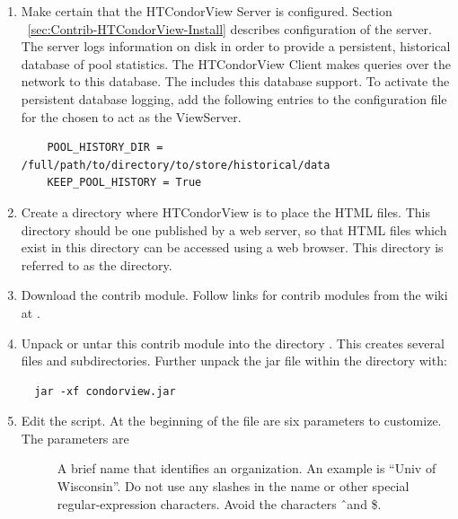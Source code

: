 \begin{enumerate}

\item Make certain that the HTCondorView Server is configured.
Section ~\ref{sec:Contrib-HTCondorView-Install}
describes configuration of the server.
The server logs information on disk in order to provide a persistent,
historical database of pool statistics.
The HTCondorView Client makes queries over the network to this
database.
The  includes this database support.
To activate the persistent database logging, add the following entries to
the configuration file for the  chosen to act as the ViewServer.
\begin{verbatim}
    POOL_HISTORY_DIR = /full/path/to/directory/to/store/historical/data 
    KEEP_POOL_HISTORY = True 
\end{verbatim}

\item Create a directory where HTCondorView is to place the HTML files.  
This directory should be one published by a web server, so that HTML
files which exist in this directory can be accessed using a web browser.  
This directory is referred to as the  directory.

\item Download the  contrib module.
Follow links for contrib modules from the wiki at
.

\item Unpack or untar this contrib module into the
directory .
This creates several files and subdirectories.
Further unpack the jar file within the  directory with:
\begin{verbatim} 
  jar -xf condorview.jar
\end{verbatim}

\item Edit the  script.  At the beginning of the file
are six parameters to customize.
The parameters are

        \begin{description}

	\item[] A brief name that identifies an
	organization. An example is ``Univ of Wisconsin''.  Do not
	use any slashes in the name or other special regular-expression
	characters. Avoid the characters \Bs \^\  and \$.


\end{description}
\end{enumerate}
